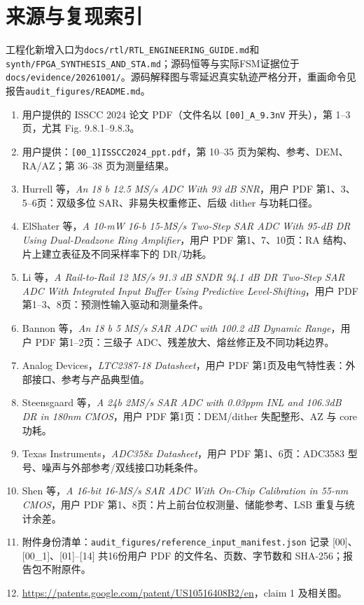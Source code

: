 \documentclass[UTF8,fontset=fandol,11pt,a4paper,openany]{ctexrep}
\newcommand{\code}[1]{\nolinkurl{#1}}
\begin{document}
\chapter{来源与复现索引}
工程化新增入口为\code{docs/rtl/RTL_ENGINEERING_GUIDE.md}和\code{synth/FPGA_SYNTHESIS_AND_STA.md}；源码恒等与实际FSM证据位于\code{docs/evidence/20261001/}。源码解释图与零延迟真实轨迹严格分开，重画命令见报告\code{audit_figures/README.md}。
\begin{enumerate}
\item [00] 用户提供的 ISSCC 2024 论文 PDF（文件名以 \code{[00]_A_9.3nV} 开头），第 1--3 页，尤其 Fig. 9.8.1--9.8.3。
\item [00\_1] 用户提供：\code{[00_1]ISSCC2024_ppt.pdf}，第 10--35 页为架构、参考、DEM、RA/AZ；第 36--38 页为测量结果。
\item [01] Hurrell 等，\emph{An 18 b 12.5 MS/s ADC With 93 dB SNR}，用户 PDF 第1、3、5--6页：双级多位 SAR、非易失权重修正、后级 dither 与功耗口径。
\item [02] ElShater 等，\emph{A 10-mW 16-b 15-MS/s Two-Step SAR ADC With 95-dB DR Using Dual-Deadzone Ring Amplifier}，用户 PDF 第1、7、10页：RA 结构、片上建立表征及不同采样率下的 DR/功耗。
\item [03] Li 等，\emph{A Rail-to-Rail 12 MS/s 91.3 dB SNDR 94.1 dB DR Two-Step SAR ADC With Integrated Input Buffer Using Predictive Level-Shifting}，用户 PDF 第1--3、8页：预测性输入驱动和测量条件。
\item [04] Bannon 等，\emph{An 18 b 5 MS/s SAR ADC with 100.2 dB Dynamic Range}，用户 PDF 第1--2页：三级子 ADC、残差放大、熔丝修正及不同功耗边界。
\item [05] Analog Devices，\emph{LTC2387-18 Datasheet}，用户 PDF 第1页及电气特性表：外部接口、参考与产品典型值。
\item [06] Steensgaard 等，\emph{A 24b 2MS/s SAR ADC with 0.03ppm INL and 106.3dB DR in 180nm CMOS}，用户 PDF 第1页：DEM/dither 失配整形、AZ 与 core 功耗。
\item [07] Texas Instruments，\emph{ADC358x Datasheet}，用户 PDF 第1、6页：ADC3583 型号、噪声与外部参考/双线接口功耗条件。
\item [08] Shen 等，\emph{A 16-bit 16-MS/s SAR ADC With On-Chip Calibration in 55-nm CMOS}，用户 PDF 第1、8页：片上前台位权测量、储能参考、LSB 重复与统计余差。
\item 附件身份清单：\code{audit_figures/reference_input_manifest.json} 记录 [00]、[00\_1]、[01]--[14] 共16份用户 PDF 的文件名、页数、字节数和 SHA-256；报告包不附原件。
\item [09] \url{https://patents.google.com/patent/US10516408B2/en}，claim 1 及相关图。

\end{enumerate}
\end{document}
